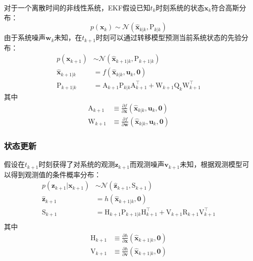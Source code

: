 对于一个离散时间的非线性系统，EKF假设已知$t_k$时刻系统的状态$\bm{x}_k$符合高斯分布：
\begin{equation}
    p(\bm{x}_k) \sim \mathcal{N}(\hat{\bm{x}}_{k|k},\mathrm{P}_{k|k})
\end{equation}
由于系统噪声$\bm{w}_k$未知，在$t_{k+1}$时刻可以通过转移模型预测当前系统状态的先验分布：
\begin{equation}
\begin{aligned}
    p(\bm{x}_{k+1}) &\sim \mathcal{N}(\hat{\bm{x}}_{k+1|k},\mathrm{P}_{k+1|k}) \\
    \hat{\bm{x}}_{k+1|k} &= f(\hat{\bm{x}}_{k|k},\bm{u}_k,\bm{0}) \\
    \mathrm{P}_{k+1|k}   &= \mathrm{A}_{k+1} \mathrm{P}_{k|k} \mathrm{A}_{k+1}^\top +
                            \mathrm{W}_{k+1}\mathrm{Q}_k\mathrm{W}_{k+1}^\top
\end{aligned}
\end{equation}
其中
\begin{equation}
\begin{aligned}
    \mathrm{A}_{k+1} &\equiv
        \frac{\partial f}
             {\partial\bm{x}}(\hat{\bm{x}}_{k|k},\bm{u}_k,\bm{0}) \\
    \mathrm{W}_{k+1} &\equiv
        \frac{\partial f}
             {\partial\bm{w}}(\hat{\bm{x}}_{k|k},\bm{u}_k,\bm{0})
\end{aligned}
\end{equation}

\subsubsection{状态更新}

假设在$t_{k+1}$时刻获得了对系统的观测$\bm{z}_{k+1}$而观测噪声$\bm{v}_{k+1}$未知，根据观测模型可以得到观测值的条件概率分布：
\begin{equation}
\begin{aligned}
    p(\bm{z}_{k+1}|\bm{x}_{k+1}) &\sim \mathcal{N}(\hat{\bm{z}}_{k+1}, \mathrm{S}_{k+1}) \\
    \hat{\bm{z}}_{k+1} &= h(\hat{\bm{x}}_{k+1|k},\bm{0}) \\
    \mathrm{S}_{k+1} &= \mathrm{H}_{k+1}\mathrm{P}_{k+1|k}\mathrm{H}_{k+1}^\top +
                        \mathrm{V}_{k+1}\mathrm{R}_{k+1}\mathrm{V}_{k+1}^\top \\
\end{aligned}
\end{equation}
其中
\begin{equation}
\begin{aligned}
    \mathrm{H}_{k+1} &\equiv
        \frac{\partial h}
             {\partial\bm{x}}(\hat{\bm{x}}_{k+1|k},\bm{0}) \\
    \mathrm{V}_{k+1} &\equiv
        \frac{\partial h}
             {\partial\bm{v}}(\hat{\bm{x}}_{k+1|k},\bm{0})
\end{aligned}
\end{equation}

